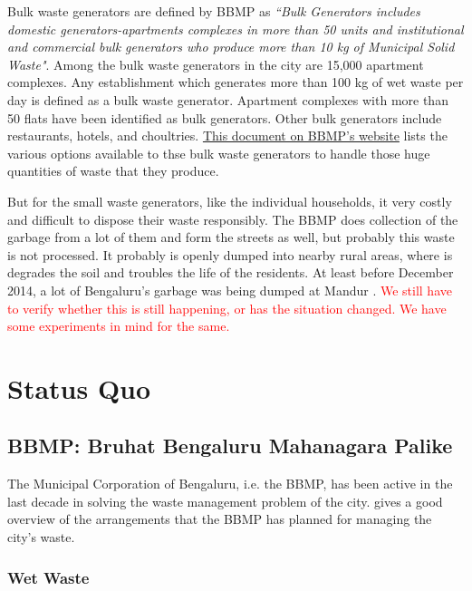 \documentclass[10pt]{article}
\begin{document}
Bulk waste generators are defined by BBMP as \emph{``Bulk Generators includes domestic generators-apartments complexes in more than 50 units and institutional and commercial bulk generators who produce more than 10 kg of Municipal Solid Waste"}. Among the bulk waste generators in the city are 15,000 apartment complexes. Any establishment which generates more than 100 kg of wet waste per day is defined as a bulk waste generator. Apartment complexes with more than 50 flats have been identified as bulk generators. Other bulk generators include restaurants, hotels, and choultries\citep{BangaloreMirror:bulk_waste_generators}. \href{http://bbmp.gov.in/documents/10180/2201631/Approved+Vendor+List+with+note+for+Website+21-06-2016.pdf/34567fdf-8d69-4b12-8440-9475ba4a0567}{This document on BBMP's website} lists the various options available to thse bulk waste generators to handle those huge quantities of waste that they produce.

But for the small waste generators, like the individual households, it very costly and difficult to dispose their waste responsibly. The BBMP does collection of the garbage from a lot of them and form the streets as well, but probably this waste is not processed. It probably is openly dumped into nearby rural areas, where is degrades the soil and troubles the life of the residents. At least before December 2014, a lot of Bengaluru's garbage was being dumped at Mandur \citep{BangaloreMirror:bulk_waste_generators}.
\textcolor{red}{We still have to verify whether this is still happening, or has the situation changed. We have some experiments in mind for the same.}

\section{Status Quo}



\subsection{BBMP: Bruhat Bengaluru Mahanagara Palike}

The Municipal Corporation of Bengaluru, i.e. the BBMP, has been active in the last decade in solving the waste management problem of the city. \cite{BBMP:SWMOverview} gives a good overview of the arrangements that the BBMP has planned for managing the city's waste.

\subsubsection{Wet Waste}
\end{document}
